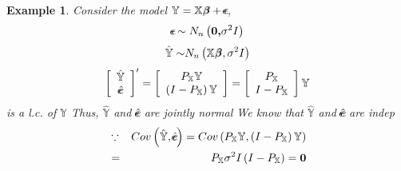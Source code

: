 \documentclass{article}
\newtheorem{example}[theorem]{Example}
\begin{document}
\begin{example}
Consider the model $\mathbb{Y=X}%
\beta\mkern-9.6mu \beta%
+%
\epsilon\mkern-10mu \epsilon%
$, 
\begin{equation*}
\epsilon\mkern-10mu \epsilon%
\sim N_{n}\left( \boldsymbol{0,}\sigma ^{2}I\right)
\end{equation*}%
\begin{equation*}
\mathbb{\hat{Y}\sim }N_{n}\left( \mathbb{X}%
\beta\mkern-9.6mu \beta%
,\sigma ^{2}I\right)
\end{equation*}%
\begin{equation*}
\left[ 
\begin{array}{c}
\mathbb{\hat{Y}} \\ 
\hat{e\mkern-10.5mu e}%
\end{array}%
\right] ^{\prime }=\left[ 
\begin{array}{c}
P_{\mathbb{X}}\mathbb{Y} \\ 
\left( I-P_{\mathbb{X}}\right) \mathbb{Y}%
\end{array}%
\right] =\left[ 
\begin{array}{c}
P_{\mathbb{X}} \\ 
I-P_{\mathbb{X}}%
\end{array}%
\right] \mathbb{Y}
\end{equation*}%
is a l.c. of $\mathbb{Y}$\newline
Thus, $\mathbb{\hat{Y}}$ and $%
\hat{e\mkern-10.5mu e}%
$ are jointly normal\newline
\newline
We know that $\mathbb{\hat{Y}}$ and $%
\hat{e\mkern-10.5mu e}%
$ are indep%
\begin{eqnarray*}
&\because &Cov\left( \mathbb{\hat{Y}},%
\hat{e\mkern-10.5mu e}%
\right) =Cov\left( P_{\mathbb{X}}\mathbb{Y},\left( I-P_{\mathbb{X}}\right) 
\mathbb{Y}\right) \\
&=&P_{\mathbb{X}}\sigma ^{2}I\left( I-P_{\mathbb{X}}\right) =\boldsymbol{0}
\end{eqnarray*}
\end{example}
\end{document}
